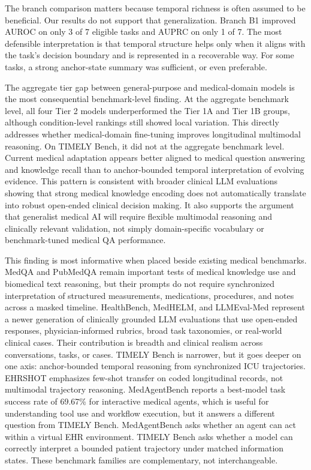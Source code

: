 \documentclass[pdflatex,sn-nature]{sn-jnl}
\begin{document}
The branch comparison matters because temporal richness is often assumed to be beneficial. Our results do not support that generalization. Branch B1 improved AUROC on only 3 of 7 eligible tasks and AUPRC on only 1 of 7. The most defensible interpretation is that temporal structure helps only when it aligns with the task's decision boundary and is represented in a recoverable way. For some tasks, a strong anchor-state summary was sufficient, or even preferable.

The aggregate tier gap between general-purpose and medical-domain models is the most consequential benchmark-level finding. At the aggregate benchmark level, all four Tier 2 models underperformed the Tier 1A and Tier 1B groups, although condition-level rankings still showed local variation. This directly addresses whether medical-domain fine-tuning improves longitudinal multimodal reasoning. On TIMELY Bench, it did not at the aggregate benchmark level. Current medical adaptation appears better aligned to medical question answering and knowledge recall than to anchor-bounded temporal interpretation of evolving evidence. This pattern is consistent with broader clinical LLM evaluations showing that strong medical knowledge encoding does not automatically translate into robust open-ended clinical decision making\cite{singhal2023clinicalknowledge,hager2024clinicaldecision}. It also supports the argument that generalist medical AI will require flexible multimodal reasoning and clinically relevant validation, not simply domain-specific vocabulary or benchmark-tuned medical QA performance\cite{moor2023gmai,saab2024gemini}.

This finding is most informative when placed beside existing medical benchmarks. MedQA and PubMedQA remain important tests of medical knowledge use and biomedical text reasoning, but their prompts do not require synchronized interpretation of structured measurements, medications, procedures, and notes across a masked timeline\cite{jin2021medqa,jin2019pubmedqa}. HealthBench, MedHELM, and LLMEval-Med represent a newer generation of clinically grounded LLM evaluations that use open-ended responses, physician-informed rubrics, broad task taxonomies, or real-world clinical cases\cite{arora2025healthbench,bedi2025medhelm,zhang2025llmevalmed}. Their contribution is breadth and clinical realism across conversations, tasks, or cases. TIMELY Bench is narrower, but it goes deeper on one axis: anchor-bounded temporal reasoning from synchronized ICU trajectories. EHRSHOT emphasizes few-shot transfer on coded longitudinal records, not multimodal trajectory reasoning\cite{wornow2023ehrshot}. MedAgentBench reports a best-model task success rate of 69.67\% for interactive medical agents, which is useful for understanding tool use and workflow execution, but it answers a different question from TIMELY Bench\cite{jiang2025medagentbench}. MedAgentBench asks whether an agent can act within a virtual EHR environment. TIMELY Bench asks whether a model can correctly interpret a bounded patient trajectory under matched information states. These benchmark families are complementary, not interchangeable.
\end{document}
